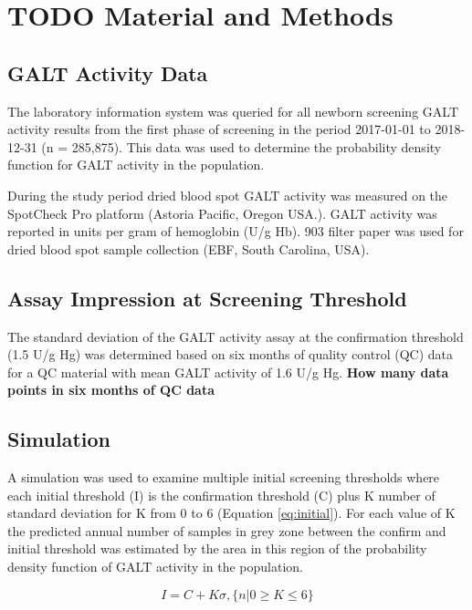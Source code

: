 \documentclass[review]{elsarticle}
\begin{document}
\clearpage

\section*{{\bfseries\sffamily TODO} Material and Methods}
\label{sec:orgdc50fe1}
\subsection*{GALT Activity Data}
\label{sec:orga6f5bc0}
The laboratory information system was queried for all newborn
screening GALT activity results from the first phase of screening in
the period 2017-01-01 to 2018-12-31 (n = 285,875). This data was used
to determine the probability density function for GALT activity in the
population.

During the study period dried blood spot GALT activity was measured
on the SpotCheck Pro platform (Astoria Pacific, Oregon USA.). GALT
activity was reported in units per gram of hemoglobin (U/g Hb). 903
filter paper was used for dried blood spot sample collection (EBF,
South Carolina, USA).

\subsection*{Assay Impression at Screening Threshold}
\label{sec:org6c17384}
The standard deviation of the GALT activity assay at the confirmation
threshold (1.5 U/g Hg) was determined based on six months of quality
control (QC) data for a QC material with mean GALT activity of 1.6 U/g
Hg.  \textbf{How many data points in six months of QC data}

\subsection*{Simulation}
\label{sec:org811c5ec}
A simulation was used to examine multiple initial screening thresholds
where each initial threshold (I) is the confirmation threshold (C)
plus K number of standard deviation for K from 0 to 6 (Equation
\ref{eq:initial}). For each value of K the predicted annual number of
samples in grey zone between the confirm and initial threshold was
estimated by the area in this region of the probability density
function of GALT activity in the population.

\begin{equation}\label{eq:initial}
I = C + K\sigma , \{n|0\ge K\le6\} 
\end{equation}
\end{document}

